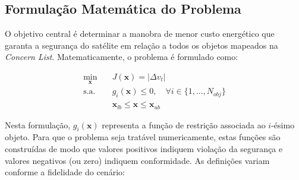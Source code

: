 \subsection{Formulação Matemática do Problema}

O objetivo central é determinar a manobra de menor custo energético que garanta a segurança do satélite em relação a todos os objetos mapeados na \textit{Concern List}. Matematicamente, o problema é formulado como:

\begin{equation}
    \begin{aligned}
        \min_{\mathbf{x}} \quad & J(\mathbf{x}) = |\Delta v_t| \\
        \textrm{s.a.} \quad & g_i(\mathbf{x}) \le 0, \quad \forall i \in \{1, \dots, N_{obj}\} \\
                            & \mathbf{x}_{lb} \le \mathbf{x} \le \mathbf{x}_{ub}
    \end{aligned}
    \label{eq:optimization_problem}
\end{equation}

Nesta formulação, $g_i(\mathbf{x})$ representa a função de restrição associada ao $i$-ésimo objeto. Para que o problema seja tratável numericamente, estas funções são construídas de modo que valores positivos indiquem violação da segurança e valores negativos (ou zero) indiquem conformidade. As definições variam conforme a fidelidade do cenário:

